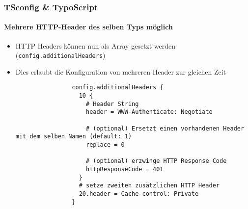 
\begin{frame}[fragile]
	\frametitle{TSconfig \& TypoScript}
	\framesubtitle{Mehrere HTTP-Header des selben Typs möglich}

	\begin{itemize}

		\item HTTP Headers können nun als Array gesetzt werden (\small\texttt{config.additionalHeaders}\normalsize)
		\item Dies erlaubt die Konfiguration von mehreren Header zur gleichen Zeit

			\begin{lstlisting}
				config.additionalHeaders {
				  10 {
				    # Header String
				    header = WWW-Authenticate: Negotiate

				    # (optional) Ersetzt einen vorhandenen Header mit dem selben Namen (default: 1)
				    replace = 0

				    # (optional) erzwinge HTTP Response Code
				    httpResponseCode = 401
				  }
				  # setze zweiten zusätzlichen HTTP Header
				  20.header = Cache-control: Private
				}
			\end{lstlisting}

	\end{itemize}

\end{frame}


